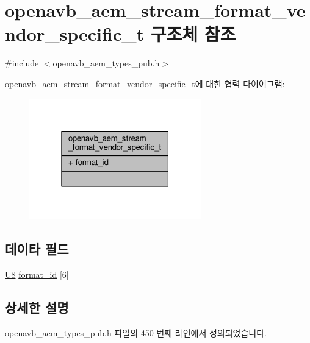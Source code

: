 \hypertarget{structopenavb__aem__stream__format__vendor__specific__t}{}\section{openavb\+\_\+aem\+\_\+stream\+\_\+format\+\_\+vendor\+\_\+specific\+\_\+t 구조체 참조}
\label{structopenavb__aem__stream__format__vendor__specific__t}


{\ttfamily \#include $<$openavb\+\_\+aem\+\_\+types\+\_\+pub.\+h$>$}



openavb\+\_\+aem\+\_\+stream\+\_\+format\+\_\+vendor\+\_\+specific\+\_\+t에 대한 협력 다이어그램\+:
\nopagebreak
\begin{figure}[H]
\begin{center}
\leavevmode
\includegraphics[width=211pt]{structopenavb__aem__stream__format__vendor__specific__t__coll__graph}
\end{center}
\end{figure}
\subsection*{데이타 필드}
\begin{DoxyCompactItemize}
\item 
\hyperlink{openavb__types__base__pub_8h_aa63ef7b996d5487ce35a5a66601f3e73}{U8} \hyperlink{structopenavb__aem__stream__format__vendor__specific__t_ae1ff7c8bfecfa86c9ab47966bf21d53e}{format\+\_\+id} \mbox{[}6\mbox{]}
\end{DoxyCompactItemize}


\subsection{상세한 설명}


openavb\+\_\+aem\+\_\+types\+\_\+pub.\+h 파일의 450 번째 라인에서 정의되었습니다.



